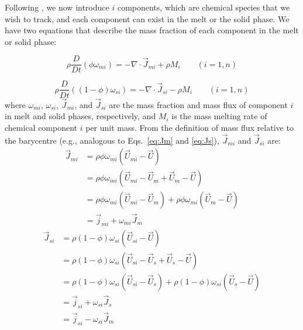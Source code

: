 \noindent
Following \cite{ABE95}, we now introduce $i$ components, which are chemical species that we wish to track, and each component can exist in the melt or the solid phase.  We have two equations that describe the mass fraction of each component in the melt or solid phase:

\begin{equation}
\rho \frac{D}{Dt} (\phi \omega_{mi} ) = -\nabla \cdot \vec{J}_{mi} + \rho M_i \qquad (i=1,n)
\label{eq:cons_omega_mi}
\end{equation}

\begin{equation}
\rho \frac{D}{Dt} ((1-\phi) \omega_{si} ) = -\nabla \cdot \vec{J}_{si} - \rho M_i \qquad (i=1,n)
\label{eq:cons_omega_si}
\end{equation}
where $\omega_{mi}$, $\omega_{si}$, $\vec{J}_{mi}$, and $\vec{J}_{si}$ are the mass fraction and mass flux of component $i$ in melt and solid phases, respectively, and $M_i$ is the mass melting rate of chemical component $i$ per unit mass.  From the definition of mass flux relative to the barycentre (e.g., analogous to Eqs.~\ref{eq:Jm} and \ref{eq:Js}), $\vec{J}_{mi}$ and $\vec{J}_{si}$ are:
\begin{subequations}
\begin{align}
\vec{J}_{mi}&= \rho \phi \omega_{mi} (\vec{U}_{mi} - \vec{U} )\\
&= \rho \phi \omega_{mi} (\vec{U}_{mi} - \vec{U}_{m} + \vec{U}_m - \vec{U} )\\
&= \rho \phi \omega_{mi} (\vec{U}_{mi} - \vec{U}_{m} ) + \rho \phi \omega_{mi} ( \vec{U}_m - \vec{U} )\\
&= \vec{j}_{mi} + \omega_{mi} \vec{J}_m
\end{align}
\label{eq:J_mi2}
\end{subequations}
\begin{subequations}
\begin{align}
\vec{J}_{si}&= \rho (1-\phi) \omega_{si} (\vec{U}_{si} - \vec{U} )\\
&= \rho (1-\phi) \omega_{si} (\vec{U}_{si} - \vec{U}_s + \vec{U}_s - \vec{U} )\\
&= \rho (1-\phi) \omega_{si} (\vec{U}_{si} - \vec{U}_s) + \rho (1-\phi) \omega_{si} (\vec{U}_{s} - \vec{U})\\
&= \vec{j}_{si} + \omega_{si} \vec{J}_s\\
&= \vec{j}_{si} - \omega_{si} \vec{J}_m
\end{align}
\label{eq:J_si2}
\end{subequations}
